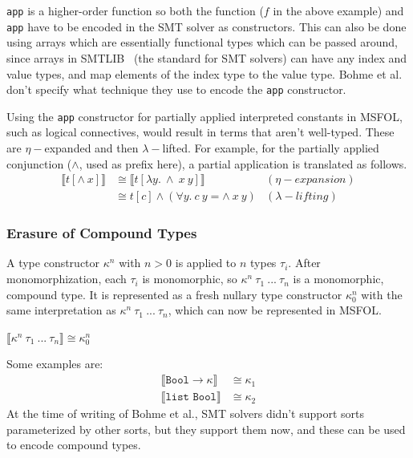 \documentclass{article}
\begin{document}
	\texttt{app} is a higher-order 
	function so both the function 
	($f$ in the above example) and 
	\texttt{app} have to be encoded 
	in the SMT solver as constructors.
	This can also be done using arrays 
	which are essentially functional 
	types which can be passed
	around, since arrays in 
	SMTLIB~\cite{BarFT-SMTLIB} (the 
	standard for SMT solvers)
	can have any index and value types, 
	and map elements of the index type 
	to the value type. Bohme et al. 
	don't specify what technique 
	they use to encode the 
	\texttt{app} constructor.
	
	Using the \texttt{app} constructor
	for partially applied interpreted 
	constants in MSFOL, such as 
	logical connectives, would result 
	in terms that aren't well-typed.
	These are $\eta-$expanded and 
	then $\lambda-$lifted. For example, 
	for the partially applied 
	conjunction ($\land$, used as prefix 
	here), a partial application is 
	translated as follows.
	\begin{align*}
	\llbracket t [\land\ x] 
	\rrbracket &\cong \llbracket 
	t[\lambda y.\ \land\ x\ y]
	\rrbracket&(\eta-expansion)\\
	&\cong t[c]  \land (\forall y.\ 
	c\ y = \land\ x\ y) &(\lambda-lifting)
	\end{align*}
	
	\subsubsection{Erasure of Compound Types}
	A type constructor $\kappa^n$ with 
	$n > 0$ is applied to $n$ types 
	$\tau_i$. After monomorphization, 
	each $\tau_i$ is monomorphic, so 
	$\kappa^n\ \tau_1\ ...\ \tau_n$ 
	is a monomorphic, compound type. It
	is represented as a fresh nullary 
	type constructor $\kappa_0^n$ with 
	the same interpretation as 
	$\kappa^n\ \tau_1\ ...\ \tau_n$, 
	which can now be represented in 
	MSFOL.
	\begin{center}
		$\llbracket \kappa^n\ 
		\tau_1\ ...\ \tau_n \rrbracket
		\cong \kappa_0^n$
	\end{center}
	Some examples are:
	\begin{align*}
	\llbracket \texttt{Bool} \to
	\kappa \rrbracket &\cong \kappa_1\\
	\llbracket \texttt{list\ Bool}
	\rrbracket &\cong \kappa_2
	\end{align*}
	At the time of writing of Bohme et al.,
	SMT solvers didn't support sorts 
	parameterized by other sorts, but they 
	support them now, and these can be 
	used to encode compound types.
	
\end{document}
